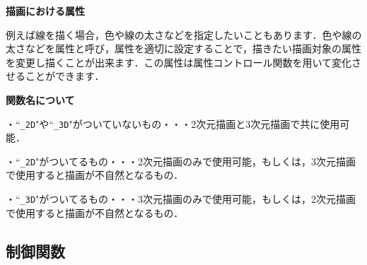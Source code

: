 \documentclass[platex,a4paper,12pt]{jsarticle}%
\begin{document}



\vspace{5mm}
\noindent
{\bf 描画における属性}

例えば線を描く場合，色や線の太さなどを指定したいこともあります．色や線の太さなどを属性と呼び，属性を適切に設定することで，描きたい描画対象の属性を変更し描くことが出来ます．この属性は属性コントロール関数を用いて変化させることができます．

\vspace{5mm}
\noindent
{\bf 関数名について}

\noindent
・``\verb|_2D|"や``\verb|_3D|"がついていないもの・・・2次元描画と3次元描画で共に使用可能．

\noindent
・``\verb|_2D|"がついてるもの・・・2次元描画のみで使用可能，もしくは，3次元描画で使用すると描画が不自然となるもの．

\noindent
・``\verb|_3D|"がついてるもの・・・3次元描画のみで使用可能，もしくは，2次元描画で使用すると描画が不自然となるもの．



\clearpage
\subsection{制御関数}
\end{document}
